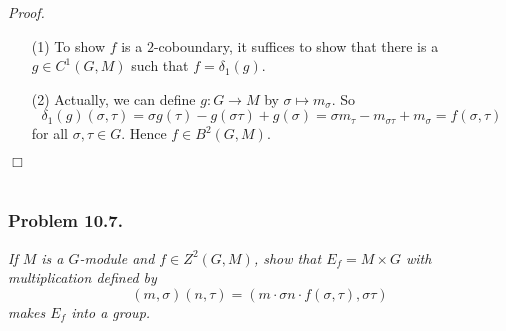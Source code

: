 \documentclass{article}
\begin{document}
\emph{Proof.}
\begin{enumerate}
\item[(1)]
  To show $f$ is a $2$-coboundary,
  it suffices to show that there is a $g \in C^{1}(G,M)$ such that $f = \delta_1(g)$.

\item[(2)]
  Actually, we can define $g: G \to M$ by $\sigma \mapsto m_{\sigma}$.
  So
  \[
    \delta_1(g)(\sigma,\tau)
    = \sigma g(\tau) - g(\sigma\tau) + g(\sigma)
    = \sigma m_{\tau} - m_{\sigma\tau} + m_{\sigma}
    = f(\sigma,\tau)
  \]
  for all $\sigma, \tau \in G$.
  Hence $f \in B^{2}(G,M)$.
\end{enumerate}
$\Box$ \\\\






\subsubsection*{Problem 10.7.}
\emph{If $M$ is a $G$-module and $f \in Z^2(G,M)$,
show that $E_f = M \times G$ with multiplication defined by
\[
  (m,\sigma)(n,\tau) = (m \cdot \sigma n \cdot f(\sigma,\tau), \sigma\tau)
\]
makes $E_f$ into a group.} \\
\end{document}
